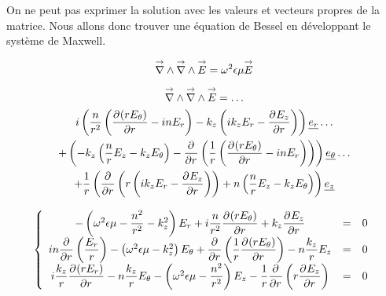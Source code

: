 On ne peut pas exprimer la solution avec les valeurs et vecteurs propres de la matrice. Nous allons donc trouver une équation de Bessel en développant le système de Maxwell.

\begin{equation}
\vrot \vrot \vE = \w^2\eps\mu \vE
\end{equation}

\begin{multline}
\vrot \vrot \vE = \dots\\
i\left(\frac{n}{r^2}\left(\ddr{r}{(rE_\theta)} - inE_r\right) - k_z\left(ik_zE_r - \ddr{r}{E_z}\right)\right)    \v{e_r} \dots\\ 
+ \left(-k_z\left(\frac{n}{r}E_z - k_zE_\theta\right) -\ddr{r}{}\left(\frac{1}{r}\left(\ddr{r}{(rE_\theta)}-inE_r\right)\right)\right)    \v{e_\theta} \dots\\
+ \frac{1}{r}\left(\ddr{r}{} \left(r\left(ik_zE_r - \ddr{r}{E_z}\right)\right) + n \left(\frac{n}{r}E_z - k_zE_\theta\right)\right) \v{e_z}
\end{multline}

\begin{equation}
\left\lbrace
\begin{array}{ccc}
-\left(\w^2\eps\mu -\frac{n^2}{r^2}  - k_z^2\right)E_r  +i\frac{n}{r^2}\ddr{r}{(rE_\theta)}  +k_z\ddr{r}{E_z} & = & 0\\
in\ddr{r}{}\left(\frac{E_r}{r}\right) -\left(\w^2\eps\mu - k_z^2\right)E_\theta + \ddr{r}{}\left(\frac{1}{r}\ddr{r}{(rE_\theta)}\right)  - n\frac{k_z}{r}E_z & = & 0\\
i\frac{k_z}{r}\ddr{r}{(rE_r)}  - n\frac{k_z}{r}E_\theta  -\left(\w^2\eps\mu - \frac{n^2}{r^2} \right)E_z - \frac{1}{r}\ddr{r}{}\left(r\ddr{r}{E_z}\right) & = & 0
\end{array}
\right.
\end{equation}



